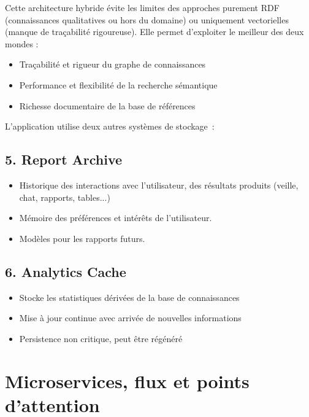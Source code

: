 \documentclass[a4paper,11pt]{report}
\providecommand{\tightlist}{\setlength{\itemsep}{0pt}\setlength{\parskip}{0pt}}
\begin{document}
Cette architecture hybride évite les limites des approches purement RDF (connaissances qualitatives ou hors du domaine) ou uniquement vectorielles (manque de traçabilité rigoureuse). Elle permet d'exploiter le meilleur des deux mondes :

\begin{itemize}
\tightlist
\item
  Traçabilité et rigueur du graphe de connaissances
\item
  Performance et flexibilité de la recherche sémantique
\item
  Richesse documentaire de la base de références
\end{itemize}

L'application utilise deux autres systèmes de stockage~:

\subsection{5. Report Archive}\label{report-archive}

\begin{itemize}
\tightlist
\item
  Historique des interactions avec l'utilisateur, des résultats produits (veille, chat, rapports, tables...)
\item
  Mémoire des préférences et intérêts de l'utilisateur.
\item
  Modèles pour les rapports futurs.
\end{itemize}

\subsection{6. Analytics Cache}\label{analytics-cache}

\begin{itemize}
\tightlist
\item
  Stocke les statistiques dérivées de la base de connaissances
\item
  Mise à jour continue avec arrivée de nouvelles informations
\item
  Persistence non critique, peut être régénéré
\end{itemize}

\section{Microservices, flux et points d'attention}\label{microservices-flux-et-points-dattention}
\end{document}

